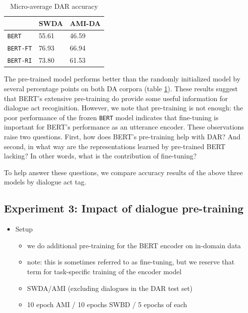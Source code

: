 \documentclass[11pt,a4paper]{article}
\begin{document}
\begin{table}[]
\centering 
\begin{tabular}{@{}lll@{}}
\toprule
                 & SWDA  & AMI-DA \\ \midrule
\texttt{BERT}       & 55.61 & 46.59  \\
\texttt{BERT-FT}    & 76.93 & 66.94  \\
\texttt{BERT-RI}    & 73.80 & 61.53  
\end{tabular}
  \caption{Micro-average DAR accuracy}
  \label{table:exp2-avg}
\end{table}    

The pre-trained model performs better than the randomly initialized model by several percentage points on both DA corpora (table \ref{table:exp2-avg}). 
These results suggest that BERT's extensive pre-training do provide some useful information for dialogue act recoginition.
However, we note that pre-training is not enough: the poor performance of the frozen \texttt{BERT} model indicates that fine-tuning is important for BERT's performance as an utterance encoder.
These observations raise two questions.
First, how does BERT's pre-training help with DAR? 
And second, in what way are the representations learned by pre-trained BERT lacking?
In other words, what is the contribution of fine-tuning?

To help answer these questions, we compare accuracy results of the above three models by dialogue act tag.


\subsection{Experiment 3: Impact of dialogue pre-training} %
\begin{itemize}
  \item Setup
    \begin{itemize}
      \item we do additional pre-training for the BERT encoder on in-domain data
      \item note: this is sometimes referred to as fine-tuning, but we reserve that term for task-specific training of the encoder model

      \item SWDA/AMI (excluding dialogues in the DAR test set)
      \item 10 epoch AMI / 10 epochs SWBD / 5 epochs of each
    \end{itemize}
\end{itemize}
\end{document}
